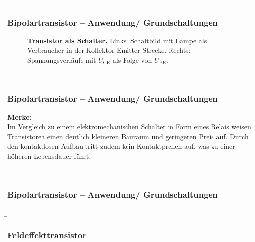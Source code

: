 \begin{frame}
     \b{ \frametitle{Bipolartransistor -- Anwendung/ Grundschaltungen}
         \begin{figure}[H]
            \label{fig:TransistorAlsSchalter}
            \caption{\textbf{Transistor als Schalter.} Links: Schaltbild mit Lampe als Verbraucher in der Kollektor-Emitter-Strecke. Rechts: 
            Spannungsverläufe mit $U_\mathrm{CE}$ als Folge von $U_\mathrm{BE}$.} 
        \end{figure}
     }
\end{frame}

\begin{frame}
    \b{\frametitle{Bipolartransistor -- Anwendung/ Grundschaltungen}
        \textbf{Merke:} \\
        Im Vergleich zu einem elektromechanischen Schalter in Form eines Relais weisen Transistoren einen 
        deutlich kleineren Bauraum und geringeren Preis auf. Durch den kontaktlosen Aufbau tritt zudem kein 
        Kontaktprellen auf, was zu einer höheren Lebensdauer führt.
        }
\end{frame}

\begin{frame}
    \b{ \frametitle{Bipolartransistor -- Anwendung/ Grundschaltungen}
        \begin{figure}[H]
            \centering
            
        \end{figure}}
\end{frame}

\begin{frame}
    \b{ \frametitle{Feldeffekttransistor}
    \begin{figure}[H]
        \centering
        \scalebox{0.9}{}
    \end{figure}
    }
\end{frame}

